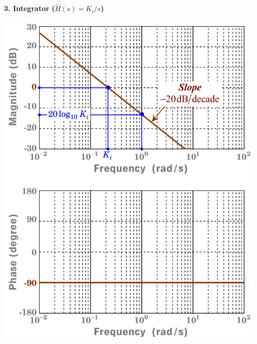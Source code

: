 \documentclass[landscape,a4paper]{extarticle}
\newenvironment{Figure}
  {\par\medskip\noindent\minipage{\linewidth}}
  {\endminipage\par\medskip}
\begin{document}
\begin{multicols*}{5}
    \textbf{3. Integrator ($\tilde{H}(s) = K_i/s$)}
    \begin{Figure}
        \centering
        \includegraphics[width=\linewidth]{bode_integrator.png}        
    \end{Figure}


\end{multicols*}
\end{document}
